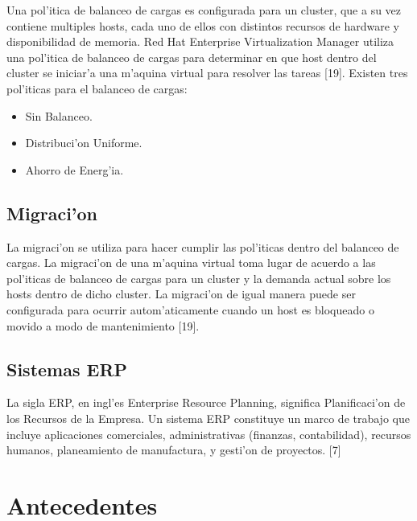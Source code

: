 Una pol'itica de balanceo de cargas es configurada para un cluster, que a su vez contiene multiples hosts, cada uno de ellos con distintos recursos de hardware y disponibilidad de memoria. Red Hat Enterprise Virtualization Manager utiliza una pol'itica de balanceo de cargas para determinar en que host dentro del cluster se iniciar'a una m'aquina virtual para resolver las tareas [19].
Existen tres pol'iticas para el balanceo de cargas:
\begin{itemize}
\item Sin Balanceo.
\item Distribuci'on Uniforme.
\item Ahorro de Energ'ia.
\end{itemize}

\subsection*{Migraci'on}

La migraci'on se utiliza para hacer cumplir las pol'iticas dentro del balanceo de cargas. La migraci'on de una m'aquina virtual toma lugar de acuerdo a las pol'iticas de balanceo de cargas para un cluster y la demanda actual sobre los hosts dentro de dicho cluster. La migraci'on de igual manera puede ser configurada para ocurrir autom'aticamente cuando un host es bloqueado o movido a modo de mantenimiento [19]. 

\subsection*{Sistemas ERP}

La sigla ERP, en ingl'es Enterprise Resource Planning, significa Planificaci'on de los Recursos de la Empresa. Un sistema ERP constituye un marco de trabajo que incluye aplicaciones comerciales, administrativas (finanzas, contabilidad), recursos humanos, planeamiento de manufactura, y gesti'on de proyectos. [7]


\section*{Antecedentes}

